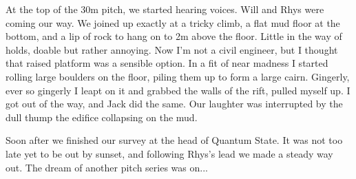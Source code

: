At the top of the 30m pitch, we started hearing voices. Will and Rhys were coming our way. We joined up exactly at a tricky climb, a flat mud floor at the bottom, and a lip of rock to hang on to 2m above the floor. Little in the way of holds, doable but rather annoying. Now I'm not a civil engineer, but I thought that raised platform was a sensible option. In a fit of near madness I started rolling large boulders on the floor, piling them up to form a large cairn. Gingerly, ever so gingerly I leapt on it and grabbed the walls of the rift, pulled myself up. I got out of the way, and Jack did the same. Our laughter was interrupted by the dull thump the edifice collapsing on the mud. 

Soon after we finished our survey at the head of Quantum State. It was not too late yet to be out by sunset, and following Rhys's lead we made a steady way out. The dream of another pitch series was on...

